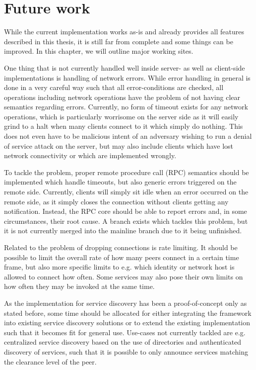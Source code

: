\chapter{Future work}

While the current implementation works as-is and already provides all features described in this thesis, it is still far from complete and some things can be improved.
In this chapter, we will outline major working sites.

One thing that is not currently handled well inside server- as well as client-side implementations is handling of network errors.
While error handling in general is done in a very careful way such that all error-conditions are checked, all operations including network operations have the problem of not having clear semantics regarding errors.
Currently, no form of timeout exists for any network operations, which is particularly worrisome on the server side as it will easily grind to a halt when many clients connect to it which simply do nothing.
This does not even have to be malicious intent of an adversary wishing to run a denial of service attack on the server, but may also include clients which have lost network connectivity or which are implemented wrongly.

To tackle the problem, proper remote procedure call (RPC) semantics should be implemented which handle timeouts, but also generic errors triggered on the remote side.
Currently, clients will simply sit idle when an error occurred on the remote side, as it simply closes the connection without clients getting any notification.
Instead, the RPC core should be able to report errors and, in some circumstances, their root cause.
A branch exists which tackles this problem, but it is not currently merged into the mainline branch due to it being unfinished.

Related to the problem of dropping connections is rate limiting.
It should be possible to limit the overall rate of how many peers connect in a certain time frame, but also more specific limits to e.g. which identity or network host is allowed to connect how often.
Some services may also pose their own limits on how often they may be invoked at the same time.

As the implementation for service discovery has been a proof-of-concept only as stated before, some time should be allocated for either integrating the framework into existing service discovery solutions or to extend the existing implementation such that it becomes fit for general use.
Use-cases not currently tackled are e.g. centralized service discovery based on the use of directories and authenticated discovery of services, such that it is possible to only announce services matching the clearance level of the peer.

